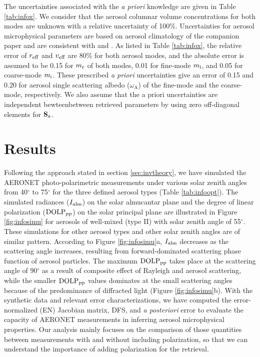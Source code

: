The uncertainties associated with the \textit{a priori} knowledge are given in
Table \ref{tab:infox}. We consider that the aerosol columnar volume 
concentrations for both modes are unknown with a relative uncertainty of
100\%. Uncertainties for aerosol microphysical parameters are based on aerosol
climatology of the companion paper and are consistent with
\citet{Dubovik02} and \citet{Waquet09}. As listed in Table
\ref{tab:infox}, the relative error of $r_\text{eff}$ and $v_\text{eff}$ are 80\% for
both aerosol modes, and the absolute error is assumed to be 0.15 for
$m_\text{r}$ of both modes, 0.01 for fine-mode $m_\text{i}$, and 0.05 for
coarse-mode $m_\text{i}$. These prescribed \textit{a priori}
uncertainties give an error of 0.15 and 0.20 for aerosol single
scattering albedo ($\omega_\text{A}$) of the fine-mode and the coarse-mode,
respectively. We also assume that the a priori uncertainties are
independent bewteenbetween retrieved parameters by using zero
off-diagonal elements for $\mathbf{S}_\text{a}$.  


\section{Results} \label{sec:inforesult}

Following the approach stated in section \ref{sec:invtheory}, 
we have simulated the AERONET photo-polarimetric measurements under various 
solar zenith angles from 40$^\circ$ to 75$^\circ$ for the three 
defined aerosol types (Table \ref{tab:infoopt}). The simulated radiances 
($I_\text{alm}$) on the solar almucantar plane and the degree of linear 
polarization ($\text{DOLP}_\text{pp}$) on the solar principal plane are illustrated in 
Figure \ref{fig:infosimu} for aerosols of well-mixed (type II) with solar 
zenith angle of 55$^\circ$. These simulations for other aerosol types and 
other solar zenith angles are of similar pattern. According to Figure
\ref{fig:infosimu}a, $I_\text{alm}$ decreases as the scattering angle increases, 
resulting from forward-dominated scattering phase function of aerosol 
particles. The maximum $\text{DOLP}_\text{pp}$ takes place at the scattering angle of 
90$^\circ$ as a result of composite effect of Rayleigh and aerosol scattering,
while the smaller $\text{DOLP}_\text{pp}$ values dominates at the small scattering angles 
because of the predominance of diffracted light (Figure \ref{fig:infosimu}b).
With the synthetic data and relevant error characterizations, we have computed
the error-normalized (EN) Jacobian matrix, DFS, and \textit{a
posteriori} error to evaluate the capacity of AERONET measurements in
inferring aerosol microphysical properties. Our analysis mainly focuses
on the comparison of those quantities between measurements with and without 
including polarization, so that we can understand the importance of adding 
polarization for the retrieval.  

